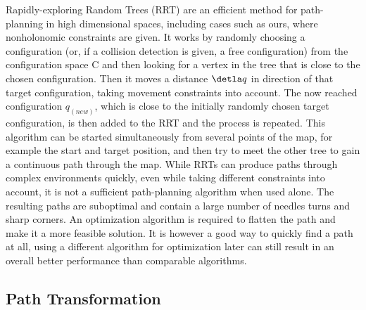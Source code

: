 Rapidly-exploring Random Trees (RRT)\cite{40} are an efficient method for path-planning in high dimensional spaces, including cases such as ours, where nonholonomic constraints are given.\cite{33,34} It works by randomly choosing a configuration (or, if a collision detection is given, a free configuration) from the configuration space C and then looking for a vertex in the tree that is close to the chosen configuration. Then it moves a distance $\detla q$ in direction of that target configuration, taking movement constraints into account. The now reached configuration $q_(new)$, which is close to the initially randomly chosen target configuration, is then added to the RRT and the process is repeated. This algorithm can be started simultaneously from several points of the map, for example the start and target position, and then try to meet the other tree to gain a continuous path through the map. While RRTs can produce paths through complex environments quickly, even while taking different constraints into account, it is not a sufficient path-planning algorithm when used alone. The resulting paths are suboptimal and contain a large number of needles turns and sharp corners. An optimization algorithm is required to flatten the path and make it a more feasible solution. It is however a good way to quickly find a path at all, using a different algorithm for optimization later can still result in an overall better performance than comparable algorithms. 

\subsection{Path Transformation}
\label{sec:pathtransformation}

